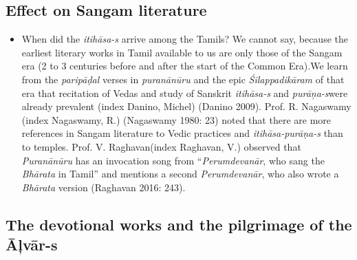 \subsection*{Effect on Sangam literature}

\begin{itemize}
\item When did the \textit{itihāsa-s} arrive among the Tamils? We cannot say, because the earliest literary works in Tamil available to us are only those of the Sangam era (2 to 3 centuries before and after the start of the Common Era).We learn from the \textit{paripāḍal} verses in \textit{puranānūru} and the epic \textit{Śilappadikāram} of that era that recitation of Vedas and study of Sanskrit \textit{itihāsa-s} and \textit{purāņa-s}\break were already prevalent (index Danino, Michel) (Danino 2009). Prof. R. Nagaswamy (index Nagaswamy, R.) (Nagaswamy 1980: 23) noted that there are more references in Sangam literature to Vedic practices and \textit{itihāsa-purāṇa-s} than to temples. Prof. V. Raghavan(index Raghavan, V.) observed that \textit{Puranānūru} has an invocation song from “\textit{Perumdevanār}, who sang the \textit{Bhārata} in Tamil” and mentions a second \textit{Perumdevanār}, who also wrote a \textit{Bhārata} version (Raghavan 2016: 243).

\end{itemize}


\subsection*{The devotional works and the pilgrimage of the Āļvār-s}

